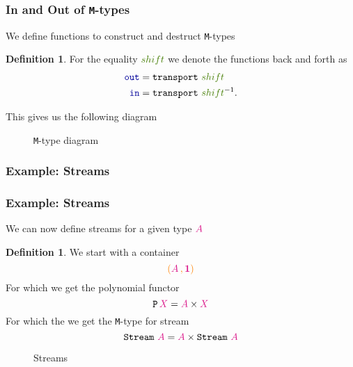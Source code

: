 \documentclass[xelatex,mathserif,serif,notheorems]{beamer} %
\theoremstyle{plain} %
\theoremstyle{definition}
\newtheorem{defn}[thm]{Definition}%
\theoremstyle{remark}
\newcommand*{\pathterm}[1]{\textcolor{green!65!red!75!black}{#1}}
\newcommand*{\type}[1]{\textcolor{magenta!90!black}{#1}}
\newcommand*{\container}[1]{\textcolor{orange}{#1}}
\newcommand*{\containerpair}[2]{\ensuremath{\colorlet{savedleftcolor}{.}\color{orange}\left(\color{savedleftcolor}#1\,\textcolor{orange}{\mathbf{,}}\,#2\color{orange}\right)\color{savedleftcolor}}}
\newcommand*{\unit}{\type{\textbf{1}}}
\newcommand*{\function}[1]{\textcolor{blue!60!black}{\ensuremath{\mathtt{#1}}}}
\newcommand*{\destructor}[1]{\textcolor{yellow!60!black}{\ensuremath{\mathtt{#1}}}}
\newcommand*{\typeformer}[1]{\ensuremath{\mathtt{#1}}}
\newcommand*{\functor}[1]{\ensuremath{\mathbf{\mathtt{#1}}}}
\newcommand*{\sym}[1]{\ensuremath{#1^{-1}}}
\newcommand{\setlengths}{
  \setlength{\abovedisplayskip}{4pt}
  \setlength{\belowdisplayskip}{4pt}
  \setlength{\abovedisplayshortskip}{2pt}
  \setlength{\belowdisplayshortskip}{2pt}
}
\begin{document}
\begin{frame}
  \frametitle{In and Out of \texttt{M}-types}
  We define functions to construct and destruct \texttt{M}-types
  \begin{defn}\setlengths
    For the equality \(\pathterm{shift}\) we denote the functions back and forth as
    \begin{align}
      \function{out} &= \mathtt{transport}~\pathterm{shift} \\
      \function{in} &= \mathtt{transport}~\sym{\pathterm{shift}}.
    \end{align}
  \end{defn}
  This gives us the following diagram
  \begin{figure}[h]
    \centering
    \caption{\texttt{M}-type diagram}
  \end{figure}
\end{frame}

\subsubsection{Example: Streams}
\begin{frame}[fragile]
  \frametitle{Example: Streams}
  We can now define streams for a given type \(\type{A}\)
  \begin{defn}\setlengths
    We start with a container
    \begin{equation}
      \containerpair{\type{A}}{\unit}
    \end{equation}
    For which we get the polynomial functor
    \begin{equation}
      \functor{P}\,\type{X} = \type{A} \times \type{X}
    \end{equation}
    For which the we get the \texttt{M}-type for stream
    \begin{equation}
      \typeformer{Stream}~\type{A} = \type{A} \times \typeformer{Stream}~\type{A}
    \end{equation}
  \end{defn}
    \begin{figure}[h]
    \centering
    \caption{Streams}
  \end{figure}
\end{frame}
\end{document}
